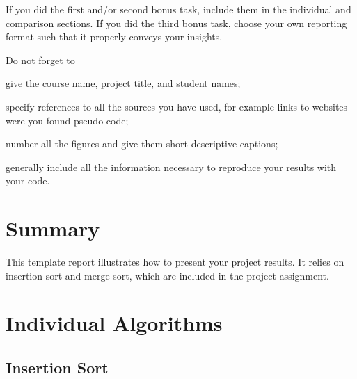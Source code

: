 \documentclass[a4paper,10pt]{article}
\begin{document}
If you did the first and/or second bonus task, include them in the individual and comparison sections.
If you did the third bonus task, choose your own reporting format such that it properly conveys your insights.

Do not forget to
\begin{compactitem}
\item
  give the course name, project title, and student names;
\item
  specify references to all the sources you have used, for example links to websites were you found pseudo-code;
\item
  number all the figures and give them short descriptive captions;
\item
  generally include all the information necessary to reproduce your results with your code.
\end{compactitem}



\section*{Summary}

This template report illustrates how to present your project results.
It relies on insertion sort and merge sort, which are included in the project assignment.



\section*{Individual Algorithms}

\subsection*{Insertion Sort}
\end{document}
